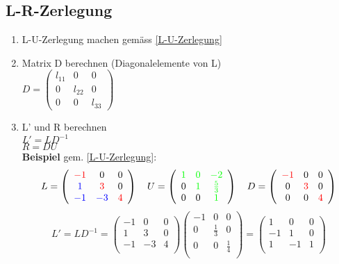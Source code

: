 \subsection{L-R-Zerlegung}
\begin{enumerate}
	\item L-U-Zerlegung machen gemäss \ref{L-U-Zerlegung}
	\item Matrix D berechnen (Diagonalelemente von L)\\
		$D=\left(\begin{array}{ccc}
			l_{11} & 0 & 0\\
			0 & l_{22} & 0\\
			0 & 0 & l_{33}
		\end{array}  \right)$
	\item L' und R berechnen\\
		$L'=LD^{-1}$\\
		$R=DU$\\
		\textbf{Beispiel} gem. \ref{L-U-Zerlegung}: \quad
		\begin{equation*}
			L=\left(\begin{array}{ccc}
			\color{red}-1 & 0 & 0\\
			\color{blue} 1 &\color{red} 3 & 0\\
			\color{blue}-1 &\color{blue} -3 &\color{red} 4\\
			\end{array}\right)
			\quad U=\left(\begin{array}{ccc}
			\color{green} 1 &\color{green} 0 &\color{green}-2\\
			0 &\color{green} 1 &\color{green} \frac 5 3\\
			0 & 0 &\color{green} 1\\
			\end{array}\right) \quad
			D=\left(\begin{array}{ccc}
			\color{red}-1 & 0 & 0\\
			 0 &\color{red} 3 & 0\\
			0 & 0 &\color{red} 4\\
			\end{array}\right)
		\end{equation*}
		\begin{equation*}
			L'=LD^{-1}=\left(\begin{array}{ccc}
			-1 & 0 & 0\\
			 1 & 3 & 0\\
			-1 & -3 & 4\\
			\end{array}\right)
			\left(\begin{array}{ccc}
			-1 & 0 & 0\\
			0 & \frac 1 3 & 0\\
			0 & 0 & \frac 1 4\\
			\end{array}\right)
			= \left(\begin{array}{ccc}
			1 & 0 & 0\\
			-1 & 1 & 0\\
			1 & -1 & 1\\
			\end{array}\right)
		\end{equation*}
		

\end{enumerate}
